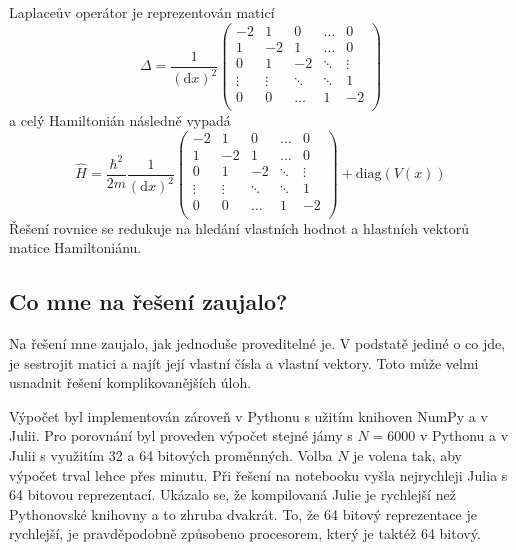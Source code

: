 \documentclass[12pt, a4paper]{article}
\begin{document}
Laplaceův operátor je reprezentován maticí
 $$\Delta = \frac{1}{(\mathrm{d}x)^2}\left(\begin{matrix}
    -2  & 1 & 0  &\dots & 0 \\
    1  & -2& 1 & \dots& 0\\
    0 & 1   & -2&  \ddots & \vdots\\
    \vdots & \vdots   & \ddots & \ddots& 1\\
    0 & 0   & \dots & 1 & -2\\
\end{matrix}\right)$$
a celý Hamiltonián následně vypadá
$$ \hat{H} =  \frac{\hbar^2}{2m} \frac{1}{(\mathrm{d}x)^2}\left(\begin{matrix}
    -2  & 1 & 0  &\dots & 0 \\
    1  & -2& 1 & \dots& 0\\
    0 & 1   & -2&  \ddots & \vdots\\
    \vdots & \vdots   & \ddots & \ddots& 1\\
    0 & 0   & \dots & 1 & -2\\
\end{matrix}\right) + \mathrm{diag}(V(x)) $$
Řešení rovnice se redukuje na hledání vlastních hodnot a hlastních vektorů matice Hamiltoniánu.

\subsection*{Co mne na řešení zaujalo?}

Na řešení mne zaujalo, jak jednoduše proveditelné je. V podstatě jediné o co jde, je sestrojit matici a najít její vlastní čísla a vlastní vektory. Toto může velmi usnadnit řešení komplikovanějších úloh.

Výpočet byl implementován zároveň v Pythonu s užitím knihoven NumPy a v Julii. Pro porovnání byl proveden výpočet stejné jámy s $N = 6000$ v Pythonu a v Julii s využitím 32 a 64 bitových proměnných. Volba $N$ je volena tak, aby výpočet trval lehce přes minutu. Při řešení na notebooku vyšla nejrychleji Julia s 64 bitovou reprezentací. Ukázalo se, že kompilovaná Julie je rychlejší než Pythonovské knihovny a to zhruba dvakrát. To, že 64 bitový reprezentace je rychlejší, je pravděpodobně způsobeno procesorem, který je taktéž 64 bitový.
\end{document}
